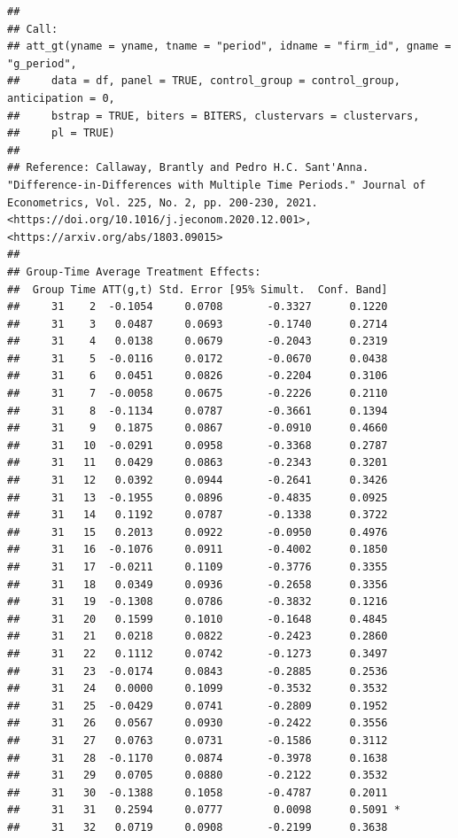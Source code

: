 \documentclass[
]{article}
\begin{document}
\begin{verbatim}
## 
## Call:
## att_gt(yname = yname, tname = "period", idname = "firm_id", gname = "g_period", 
##     data = df, panel = TRUE, control_group = control_group, anticipation = 0, 
##     bstrap = TRUE, biters = BITERS, clustervars = clustervars, 
##     pl = TRUE)
## 
## Reference: Callaway, Brantly and Pedro H.C. Sant'Anna.  "Difference-in-Differences with Multiple Time Periods." Journal of Econometrics, Vol. 225, No. 2, pp. 200-230, 2021. <https://doi.org/10.1016/j.jeconom.2020.12.001>, <https://arxiv.org/abs/1803.09015> 
## 
## Group-Time Average Treatment Effects:
##  Group Time ATT(g,t) Std. Error [95% Simult.  Conf. Band]  
##     31    2  -0.1054     0.0708       -0.3327      0.1220  
##     31    3   0.0487     0.0693       -0.1740      0.2714  
##     31    4   0.0138     0.0679       -0.2043      0.2319  
##     31    5  -0.0116     0.0172       -0.0670      0.0438  
##     31    6   0.0451     0.0826       -0.2204      0.3106  
##     31    7  -0.0058     0.0675       -0.2226      0.2110  
##     31    8  -0.1134     0.0787       -0.3661      0.1394  
##     31    9   0.1875     0.0867       -0.0910      0.4660  
##     31   10  -0.0291     0.0958       -0.3368      0.2787  
##     31   11   0.0429     0.0863       -0.2343      0.3201  
##     31   12   0.0392     0.0944       -0.2641      0.3426  
##     31   13  -0.1955     0.0896       -0.4835      0.0925  
##     31   14   0.1192     0.0787       -0.1338      0.3722  
##     31   15   0.2013     0.0922       -0.0950      0.4976  
##     31   16  -0.1076     0.0911       -0.4002      0.1850  
##     31   17  -0.0211     0.1109       -0.3776      0.3355  
##     31   18   0.0349     0.0936       -0.2658      0.3356  
##     31   19  -0.1308     0.0786       -0.3832      0.1216  
##     31   20   0.1599     0.1010       -0.1648      0.4845  
##     31   21   0.0218     0.0822       -0.2423      0.2860  
##     31   22   0.1112     0.0742       -0.1273      0.3497  
##     31   23  -0.0174     0.0843       -0.2885      0.2536  
##     31   24   0.0000     0.1099       -0.3532      0.3532  
##     31   25  -0.0429     0.0741       -0.2809      0.1952  
##     31   26   0.0567     0.0930       -0.2422      0.3556  
##     31   27   0.0763     0.0731       -0.1586      0.3112  
##     31   28  -0.1170     0.0874       -0.3978      0.1638  
##     31   29   0.0705     0.0880       -0.2122      0.3532  
##     31   30  -0.1388     0.1058       -0.4787      0.2011  
##     31   31   0.2594     0.0777        0.0098      0.5091 *
##     31   32   0.0719     0.0908       -0.2199      0.3638  

\end{verbatim}
\end{document}
